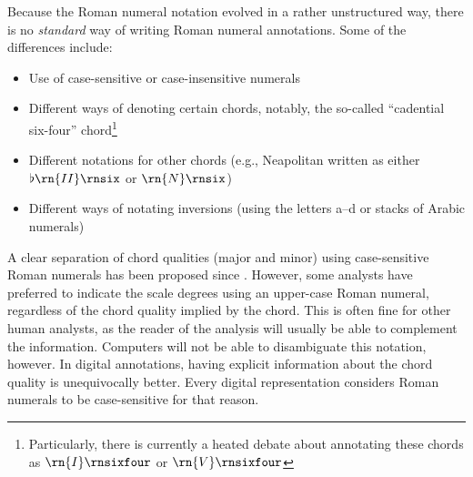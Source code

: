 

Because the Roman numeral notation evolved in a rather
unstructured way, there is no \emph{standard} way of writing
Roman numeral annotations. 
Some of the differences include:

\begin{itemize}
    \item Use of case-sensitive or case-insensitive numerals
    \item Different ways of denoting certain chords,
    notably, the so-called ``cadential six-four''
    chord\footnote{Particularly, there is currently a heated
    debate about annotating these chords as
    $\rn{I}\rnsixfour$ or $\rn{V}\rnsixfour$}
    \item Different notations for other chords (e.g.,
    Neapolitan written as either $\flat\rn{II}\rnsix$ or
    $\rn{N}\rnsix$)
    \item Different ways of notating inversions (using the
    letters a--d or stacks of Arabic numerals)
\end{itemize}

A clear separation of chord qualities (major and minor)
using case-sensitive Roman numerals has been proposed since
\textcite{weber1817versuch}. However, some analysts have
preferred to indicate the scale degrees using an upper-case
Roman numeral, regardless of the chord quality implied by
the chord. This is often fine for other human analysts, as
the reader of the analysis will usually be able to
complement the information. Computers will not be able to
disambiguate this notation, however. In digital annotations,
having explicit information about the chord quality is
unequivocally better. Every digital representation considers
Roman numerals to be case-sensitive for that reason.


